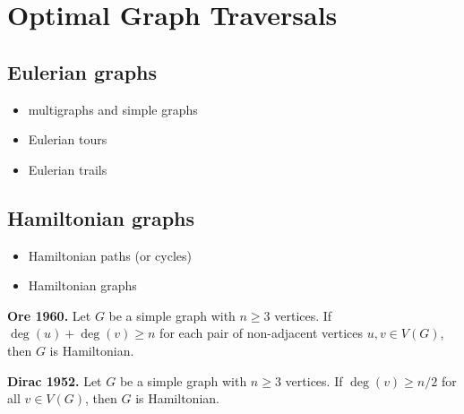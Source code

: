 
\chapter{Optimal Graph Traversals}
\label{chap:optimal_traversals}



\section{Eulerian graphs}

\begin{itemize}
\item multigraphs and simple graphs

\item Eulerian tours

\item Eulerian trails
\end{itemize}



\section{Hamiltonian graphs}

\begin{itemize}
\item Hamiltonian paths (or cycles)

\item Hamiltonian graphs
\end{itemize}

\begin{theorem}
\textbf{Ore 1960.}
Let $G$ be a simple graph with $n \geq 3$ vertices. If
$\deg(u) + \deg(v) \geq n$ for each pair of non-adjacent vertices
$u, v \in V(G)$, then $G$ is Hamiltonian.
\end{theorem}

\begin{corollary}
\textbf{Dirac 1952.}
Let $G$ be a simple graph with $n \geq 3$ vertices. If
$\deg(v) \geq n / 2$ for all $v \in V(G)$, then $G$ is Hamiltonian.
\end{corollary}


